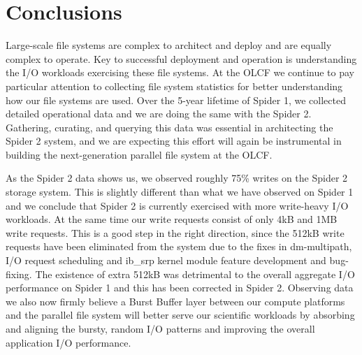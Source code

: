 \section{Conclusions}
\label{sec:conc}

Large-scale file systems are complex to architect and deploy and are equally
complex to operate. Key to successful deployment and operation is understanding
the I/O workloads exercising these file systems. At the OLCF we continue to pay
particular attention to collecting file system statistics for better
understanding how our file systems are used. Over the 5-year lifetime of Spider
1, we collected detailed operational data and we are doing the same with the
Spider 2. Gathering, curating, and querying this data was essential in
architecting the Spider 2 system, and we are expecting this effort will again
be instrumental in building the next-generation parallel file system at the
OLCF.


As the Spider 2 data shows us, we observed roughly 75\% writes on the Spider 2
storage system. This is slightly different than what we have observed on
Spider 1 and we conclude that Spider 2 is currently exercised with more
write-heavy I/O workloads. At the same time our write requests consist of only
4kB and 1MB write requests. This is a good step in the right direction, since
the 512kB write requests have been eliminated from the system due to the fixes
in dm-multipath, I/O request scheduling and ib\_srp kernel module feature
development and bug-fixing. The existence of extra 512kB was detrimental to the
overall aggregate I/O performance on Spider 1 and this has been corrected in
Spider 2. Observing data we also now firmly believe a Burst
Buffer layer between our compute platforms and the parallel file system will
better serve our scientific workloads by absorbing and aligning the bursty, random I/O
patterns and improving the overall application I/O performance. 
